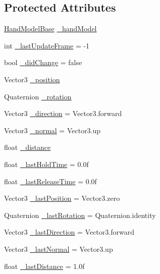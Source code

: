 \subsection*{Protected Attributes}
\begin{DoxyCompactItemize}
\item 
\mbox{\hyperlink{class_leap_1_1_unity_1_1_hand_model_base}{Hand\+Model\+Base}} \mbox{\hyperlink{class_leap_1_1_unity_1_1_abstract_hold_detector_a53c79dbe961489aea5aaedcf13d8e14d}{\+\_\+hand\+Model}}
\item 
int \mbox{\hyperlink{class_leap_1_1_unity_1_1_abstract_hold_detector_afe86c77b28a595f8bb36771c343493e9}{\+\_\+last\+Update\+Frame}} = -\/1
\item 
bool \mbox{\hyperlink{class_leap_1_1_unity_1_1_abstract_hold_detector_a046fe98d2014ccf437712773a4e02636}{\+\_\+did\+Change}} = false
\item 
Vector3 \mbox{\hyperlink{class_leap_1_1_unity_1_1_abstract_hold_detector_a05bc59028bf8ea6e9b53de9e9a5698f4}{\+\_\+position}}
\item 
Quaternion \mbox{\hyperlink{class_leap_1_1_unity_1_1_abstract_hold_detector_a63319309ae711fe6f0f05b3e12a50e2e}{\+\_\+rotation}}
\item 
Vector3 \mbox{\hyperlink{class_leap_1_1_unity_1_1_abstract_hold_detector_a81f689a33b434a9295eaccf53cba45c6}{\+\_\+direction}} = Vector3.\+forward
\item 
Vector3 \mbox{\hyperlink{class_leap_1_1_unity_1_1_abstract_hold_detector_a6e2b3843cb6fd5412b695cd3f3ec8208}{\+\_\+normal}} = Vector3.\+up
\item 
float \mbox{\hyperlink{class_leap_1_1_unity_1_1_abstract_hold_detector_abbf8d6c63e6e1168285cfb71762d347e}{\+\_\+distance}}
\item 
float \mbox{\hyperlink{class_leap_1_1_unity_1_1_abstract_hold_detector_a4faf784a6ec926339bd0af26af8d64bb}{\+\_\+last\+Hold\+Time}} = 0.\+0f
\item 
float \mbox{\hyperlink{class_leap_1_1_unity_1_1_abstract_hold_detector_ab778b10b7b1f24b9fdb86e32cd1366fe}{\+\_\+last\+Release\+Time}} = 0.\+0f
\item 
Vector3 \mbox{\hyperlink{class_leap_1_1_unity_1_1_abstract_hold_detector_a2d0c692638c620f3fd9dca0e733c45f9}{\+\_\+last\+Position}} = Vector3.\+zero
\item 
Quaternion \mbox{\hyperlink{class_leap_1_1_unity_1_1_abstract_hold_detector_a8380b54364fbf480c8b7407fe939ec8d}{\+\_\+last\+Rotation}} = Quaternion.\+identity
\item 
Vector3 \mbox{\hyperlink{class_leap_1_1_unity_1_1_abstract_hold_detector_a26945549e62d01c7788a61eb7bdd0e84}{\+\_\+last\+Direction}} = Vector3.\+forward
\item 
Vector3 \mbox{\hyperlink{class_leap_1_1_unity_1_1_abstract_hold_detector_a2fbdc9c2ca453d997cb2ba21f2eb0333}{\+\_\+last\+Normal}} = Vector3.\+up
\item 
float \mbox{\hyperlink{class_leap_1_1_unity_1_1_abstract_hold_detector_a8e359ab6c40ef82efd0f5bfbdcc75058}{\+\_\+last\+Distance}} = 1.\+0f
\end{DoxyCompactItemize}
